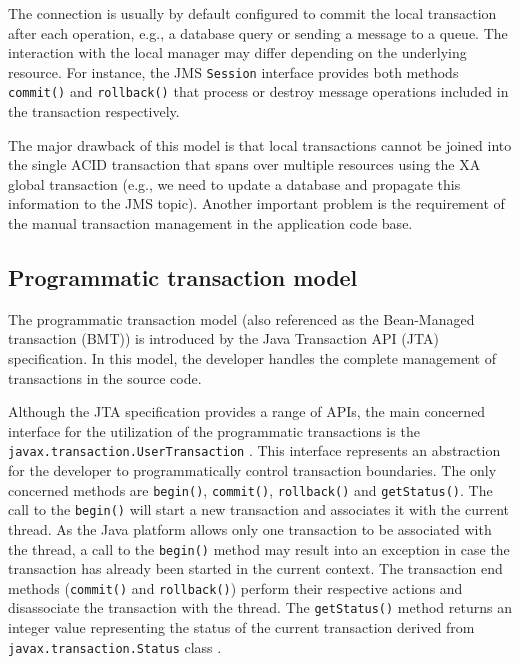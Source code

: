 \documentclass[oneside,
  digital, %
  table,   %
  lof,     %
  lot,     %
]{fithesis3}
\begin{document}
The connection is usually by default configured to commit the local transaction after each operation, e.g., a database query or sending a message to a queue. The interaction with the local manager may differ depending on the underlying resource. For instance, the JMS \texttt{Session} interface provides both methods \texttt{commit()} and \texttt{rollback()} that process or destroy message operations included in the transaction respectively.

The major drawback of this model is that local transactions cannot be joined into the single ACID transaction that spans over multiple resources using the XA global transaction \cite{java_transaction_design_strategies} (e.g., we need to update a database and propagate this information to the JMS topic). Another important problem is the requirement of the manual transaction management in the application code base.

\subsection{Programmatic transaction model}

The programmatic transaction model (also referenced as the Bean-Managed transaction (BMT)) is introduced by the Java Transaction API (JTA) specification. In this model, the developer handles the complete management of transactions in the source code.

Although the JTA specification provides a range of APIs, the main concerned interface for the utilization of the programmatic transactions is the \texttt{javax.transaction.UserTransaction} \cite{jta}. This interface represents an abstraction for the developer to programmatically control transaction boundaries. The only concerned methods are \texttt{begin()}, \texttt{commit()}, \texttt{rollback()} and \texttt{getStatus()}. The call to the \texttt{begin()} will start a new transaction and associates it with the current thread. As the Java platform allows only one transaction to be associated with the thread, a call to the \texttt{begin()} method may result into an exception in case the transaction has already been started in the current context. The transaction end methods (\texttt{commit()} and \texttt{rollback()}) perform their respective actions and disassociate the transaction with the thread. The \texttt{getStatus()} method returns an integer value representing the status of the current transaction derived from  \texttt{javax.transaction.Status} class \cite{jta}.
\end{document}
